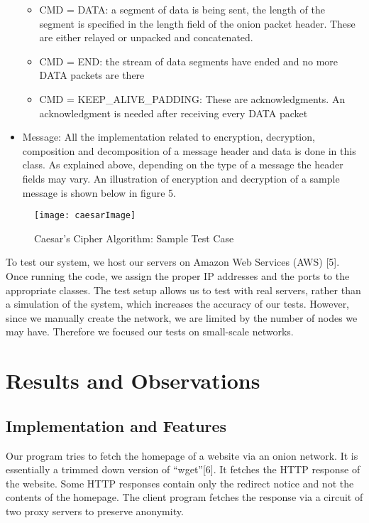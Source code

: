 \documentclass{article}
\begin{document}
\begin{itemize}
\begin {itemize}
\item CMD = DATA: a segment of data is being sent, the length of the segment is specified in the length field of the onion packet header.  These are either relayed or unpacked and concatenated. \\
\item CMD = END: the stream of data segments have ended and no more DATA packets are there\\
\item CMD = KEEP\_ALIVE\_PADDING: These are acknowledgments. An acknowledgment is needed after receiving every DATA packet \\
\end{itemize}
\item Message: All the implementation related to encryption, decryption, composition and decomposition of a message header and data is done in this class. As explained above, depending on the type of a message the header fields may vary. An illustration of encryption and decryption of a sample message is shown below in figure 5. \\
\end{itemize}

\begin{figure}[!ht]
\label{fig:vii}
    \centering
    \texttt{[image: caesarImage]}
    \caption{Caesar's Cipher Algorithm: Sample Test Case }
\end{figure}

\noindent To test our system, we host our servers on Amazon Web Services (AWS) [5]. Once running the code, we assign the proper IP addresses and the ports to the appropriate classes. The test setup allows us to test with real servers, rather than a simulation of the system, which increases the accuracy of our tests. However, since we manually create the network, we are limited by the number of nodes we may have. Therefore we focused our tests on small-scale networks. \\

\section{Results and Observations}
\subsection{Implementation and Features}
Our program tries to fetch the homepage of a website via an onion network. It is essentially a trimmed down version of ``wget''[6]. It fetches the HTTP response of the website. Some HTTP responses contain only the redirect notice and not the contents of the homepage. The client program fetches the response via a circuit of two proxy servers to preserve anonymity. \\
\end{document}
